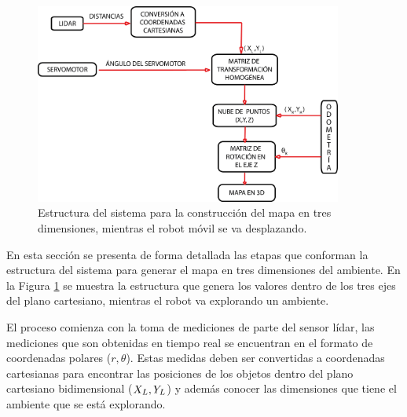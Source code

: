 \begin{figure}%
	\centering \footnotesize
	\includegraphics[width=0.9\textwidth]{images/estructura_3d.png}
	\captionsetup{font=footnotesize}
	\caption{Estructura del sistema para la construcción del mapa en tres dimensiones, mientras 
	el robot móvil se va desplazando.}
	\label{fig:Sist3D}
\end{figure}

En esta sección se presenta de forma detallada las etapas que conforman la estructura
del sistema para generar el mapa en tres dimensiones del ambiente. En la Figura \ref{fig:Sist3D} se 
muestra la estructura que genera los valores dentro de los tres ejes del plano cartesiano, mientras
el robot va explorando un ambiente.

El proceso comienza con la toma de mediciones de parte del sensor lídar, las mediciones que son 
obtenidas en tiempo real se encuentran en el formato de coordenadas polares ($r,\theta$). Estas 
medidas deben ser convertidas a coordenadas cartesianas para encontrar las posiciones de los
objetos dentro del plano cartesiano bidimensional ($\mathnormal X_{L}, \mathnormal Y_{L}$) y además conocer
las dimensiones que tiene el ambiente que se está explorando.


